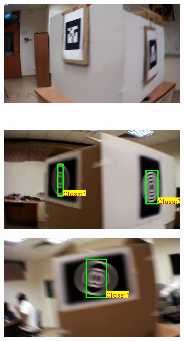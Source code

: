 \begin{figure}
\begin{subfigure}[b]{0.24\textwidth}
\end{subfigure}
\begin{subfigure}[b]{0.24\textwidth}
\includegraphics[width=\linewidth]{figures/fiducial/setup_artag/output_480.jpg}
\end{subfigure}\\
\begin{subfigure}[b]{0.24\textwidth}
\includegraphics[width=\linewidth]{figures/fiducial/setup_our/output_6/output_514.jpg}
\end{subfigure}
\begin{subfigure}[b]{0.24\textwidth}
\includegraphics[width=\linewidth]{figures/fiducial/setup_our/output_2/output_64.jpg}

\end{subfigure}
\end{figure}
